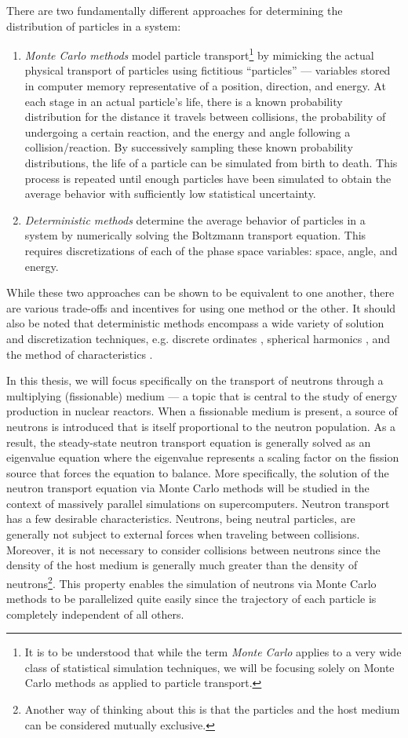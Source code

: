 There are two fundamentally different approaches for determining the
distribution of particles in a system:
\begin{enumerate}
\item \emph{Monte Carlo methods} model particle transport\footnote{It is to be
  understood that while the term \emph{Monte Carlo} applies to a very wide class
  of statistical simulation techniques, we will be focusing solely on Monte
  Carlo methods as applied to particle transport.} by mimicking the actual
  physical transport of particles using fictitious ``particles'' --- variables
  stored in computer memory representative of a position, direction, and
  energy. At each stage in an actual particle's life, there is a known
  probability distribution for the distance it travels between collisions, the
  probability of undergoing a certain reaction, and the energy and angle
  following a collision/reaction. By successively sampling these known
  probability distributions, the life of a particle can be simulated from birth
  to death. This process is repeated until enough particles have been simulated
  to obtain the average behavior with sufficiently low statistical uncertainty.
\item \emph{Deterministic methods} determine the average behavior of particles
  in a system by numerically solving the Boltzmann transport equation. This
  requires discretizations of each of the phase space variables: space, angle,
  and energy.
\end{enumerate}
While these two approaches can be shown to be equivalent to one another, there
are various trade-offs and incentives for using one method or the other. It
should also be noted that deterministic methods encompass a wide variety of
solution and discretization techniques, e.g. discrete ordinates
\cite{carlson-1965}, spherical harmonics \cite{bell-1970}, and the method of
characteristics \cite{physor-smith-2002}.

In this thesis, we will focus specifically on the transport of neutrons through
a multiplying (fissionable) medium --- a topic that is central to the study of
energy production in nuclear reactors. When a fissionable medium is present, a
source of neutrons is introduced that is itself proportional to the neutron
population. As a result, the steady-state neutron transport equation is
generally solved as an eigenvalue equation where the eigenvalue represents a
scaling factor on the fission source that forces the equation to balance. More
specifically, the solution of the neutron transport equation via Monte Carlo
methods will be studied in the context of massively parallel simulations on
supercomputers. Neutron transport has a few desirable characteristics. Neutrons,
being neutral particles, are generally not subject to external forces when
traveling between collisions. Moreover, it is not necessary to consider
collisions between neutrons since the density of the host medium is generally
much greater than the density of neutrons\footnote{Another way of thinking about
  this is that the particles and the host medium can be considered mutually
  exclusive.}. This property enables the simulation of neutrons via Monte Carlo
methods to be parallelized quite easily since the trajectory of each particle is
completely independent of all others.

